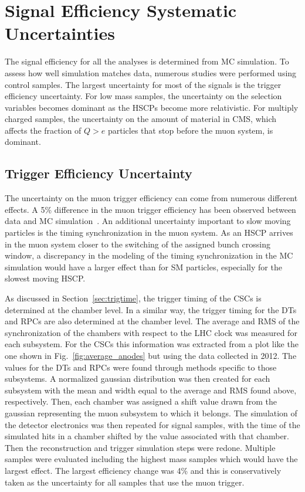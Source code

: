 \section{Signal Efficiency Systematic Uncertainties \label{sec:SystUnc}}

The signal efficiency for all the analyses is determined from MC simulation. To assess how well simulation matches data, numerous studies were performed using control samples.
The largest uncertainty for most of the signals is the trigger efficiency uncertainty. For low mass samples, the uncertainty on the selection variables becomes
dominant as the HSCPs become more relativistic. For multiply charged samples, the uncertainty on the amount of material in CMS, which affects the fraction of $Q>e$ particles
that stop before the muon system, is dominant.

\subsection{Trigger Efficiency Uncertainty}


The uncertainty on the muon trigger efficiency can come from numerous different effects. 
A 5\% difference in the muon trigger efficiency has been observed between data and MC simulation~\cite{2012JInst...7P0002T}.
An additional uncertainty important to slow moving particles is the timing synchronization in the muon system. As an HSCP arrives in the muon system
closer to the switching of the assigned bunch crossing window, a discrepancy in the modeling of the timing synchronization in the MC simulation
would have a larger effect than for SM particles, especially for the slowest moving HSCP.

As discussed in Section~\ref{sec:trigtime}, the trigger timing of the CSCs is determined at the chamber level. In a similar way,
the trigger timing for the DTs and RPCs are also determined at the chamber level.
The average and RMS of the synchronization of the chambers with respect to the LHC clock was measured for each subsystem.
For the CSCs this information was extracted from a plot like the one shown in Fig.~\ref{fig:average_anodes} but using the data collected in 2012.
The values for the DTs and RPCs were found through methods specific to those subsystems.
A normalized gaussian distribution was then created for each subsystem with the mean and width equal to the average and RMS found above, respectively.
Then, each chamber was assigned a shift value drawn from the gaussian representing the muon subsystem to which it belongs.
The simulation of the detector electronics was then repeated for signal samples, with
the time of the simulated hits in a chamber shifted by the value associated with that chamber. Then the reconstruction and trigger
simulation steps were redone. 
Multiple samples were evaluated including the highest mass samples which would have the largest effect.
The largest efficiency change was 4\% and this is conservatively taken as the uncertainty for all samples that use the muon trigger.

